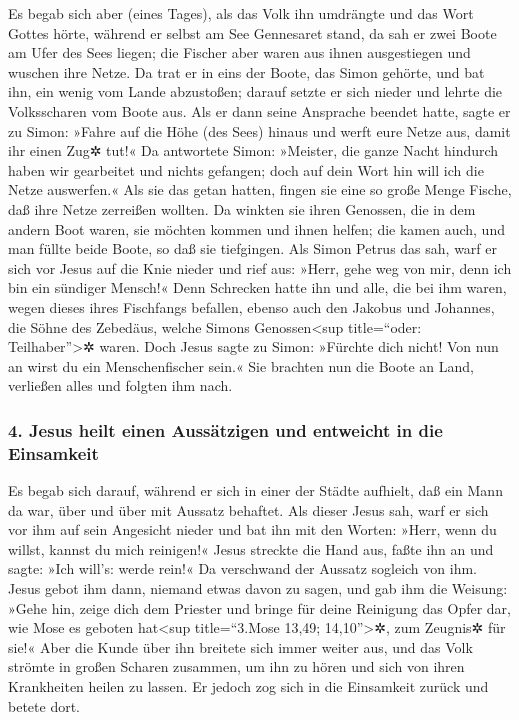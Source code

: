 Es begab sich aber (eines Tages), als das Volk ihn
umdrängte und das Wort Gottes hörte, während er selbst am See Gennesaret
stand,  da sah er zwei Boote am Ufer des Sees liegen; die
Fischer aber waren aus ihnen ausgestiegen und wuschen ihre Netze.
 Da trat er in eins der Boote, das Simon gehörte, und bat
ihn, ein wenig vom Lande abzustoßen; darauf setzte er sich nieder und
lehrte die Volksscharen vom Boote aus.  Als er dann seine
Ansprache beendet hatte, sagte er zu Simon: »Fahre auf die Höhe (des
Sees) hinaus und werft eure Netze aus, damit ihr einen Zug✲ tut!«
 Da antwortete Simon: »Meister, die ganze Nacht hindurch
haben wir gearbeitet und nichts gefangen; doch auf dein Wort hin will
ich die Netze auswerfen.«  Als sie das getan hatten,
fingen sie eine so große Menge Fische, daß ihre Netze zerreißen wollten.
 Da winkten sie ihren Genossen, die in dem andern Boot
waren, sie möchten kommen und ihnen helfen; die kamen auch, und man
füllte beide Boote, so daß sie tiefgingen.  Als Simon
Petrus das sah, warf er sich vor Jesus auf die Knie nieder und rief aus:
»Herr, gehe weg von mir, denn ich bin ein sündiger Mensch!«
 Denn Schrecken hatte ihn und alle, die bei ihm waren,
wegen dieses ihres Fischfangs befallen,  ebenso auch den
Jakobus und Johannes, die Söhne des Zebedäus, welche Simons
Genossen\textless sup title=``oder: Teilhaber''\textgreater✲ waren. Doch
Jesus sagte zu Simon: »Fürchte dich nicht! Von nun an wirst du ein
Menschenfischer sein.«  Sie brachten nun die Boote an
Land, verließen alles und folgten ihm nach.

\hypertarget{jesus-heilt-einen-aussuxe4tzigen-und-entweicht-in-die-einsamkeit}{%
\subsubsection{4. Jesus heilt einen Aussätzigen und entweicht in die
Einsamkeit}\label{jesus-heilt-einen-aussuxe4tzigen-und-entweicht-in-die-einsamkeit}}

 Es begab sich darauf, während er sich in einer der
Städte aufhielt, daß ein Mann da war, über und über mit Aussatz
behaftet. Als dieser Jesus sah, warf er sich vor ihm auf sein Angesicht
nieder und bat ihn mit den Worten: »Herr, wenn du willst, kannst du mich
reinigen!«  Jesus streckte die Hand aus, faßte ihn an und
sagte: »Ich will's: werde rein!« Da verschwand der Aussatz sogleich von
ihm.  Jesus gebot ihm dann, niemand etwas davon zu sagen,
und gab ihm die Weisung: »Gehe hin, zeige dich dem Priester und bringe
für deine Reinigung das Opfer dar, wie Mose es geboten hat\textless sup
title=``3.Mose 13,49; 14,10''\textgreater✲, zum Zeugnis✲ für sie!«
 Aber die Kunde über ihn breitete sich immer weiter aus,
und das Volk strömte in großen Scharen zusammen, um ihn zu hören und
sich von ihren Krankheiten heilen zu lassen.  Er jedoch
zog sich in die Einsamkeit zurück und betete dort.

